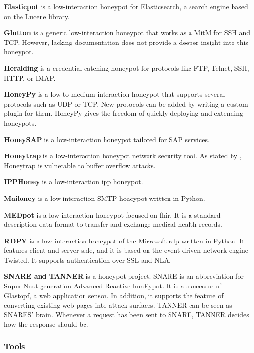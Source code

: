 \textbf{Elasticpot} \cite{elasticpot2021} is a low-interaction honeypot for Elasticsearch, a search engine based on the Lucene library.

\textbf{Glutton} \cite{glutton2021} is a generic low-interaction honeypot that works as a MitM for SSH and TCP.
However, lacking documentation does not provide a deeper insight into this honeypot.

\textbf{Heralding} \cite{heralding2021} is a credential catching honeypot for protocols like FTP, Telnet, SSH, HTTP, or IMAP.

\textbf{HoneyPy} \cite{honeysap2021} is a low to medium-interaction honeypot that supports several protocols such as UDP or TCP.
New protocols can be added by writing a custom plugin for them.
HoneyPy gives the freedom of quickly deploying and extending honeypots.

\textbf{HoneySAP} \cite{honeysap2021} is a low-interaction honeypot tailored for SAP services.

\textbf{Honeytrap} \cite{honeytrap2021} is a low-interaction honeypot network security tool.
As stated by \citet*{honeytrap2021}, Honeytrap is vulnerable to buffer overflow attacks.

\textbf{IPPHoney} \cite{ipphoney2021} is a low-interaction \ac{ipp} honeypot.

\textbf{Mailoney} \cite{mailoney2021} is a low-interaction SMTP honeypot written in Python.

\textbf{MEDpot} \cite{medpot2021} is a low-interaction honeypot focused on \ac{fhir}.
It is a standard description data format to transfer and exchange medical health records.

\textbf{RDPY} \cite{rdpy2021} is a low-interaction honeypot of the Microsoft \ac{rdp} written in Python.
It features client and server-side, and it is based on the event-driven network engine Twisted.
It supports authentication over SSL and NLA.

\textbf{SNARE and TANNER} \cite{snare2021, tanner2021} is a honeypot project.
SNARE is an abbreviation for Super Next-generation Advanced Reactive honEypot.
It is a successor of Glastopf, a web application sensor.
In addition, it supports the feature of converting existing web pages into attack surfaces.
TANNER \cite{tanner2021} can be seen as SNARES' brain.
Whenever a request has been sent to SNARE, TANNER decides how the response should be.

\subsubsection{Tools}

